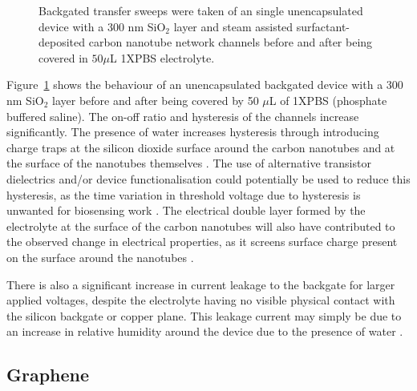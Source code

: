 \documentclass[
  a4paper,
]{scrbook}
\begin{document}
\begin{figure}
\begin{minipage}[t]{0.47\linewidth}
{{}

}

\subcaption{\label{fig-50uL-buffer}}
\end{minipage}%

\caption{\label{fig-buffer-effect-on-backgate}Backgated transfer sweeps
were taken of an single unencapsulated device with a 300 nm SiO\(_2\)
layer and steam assisted surfactant-deposited carbon nanotube network
channels before and after being covered in \(50 \mu\)L 1XPBS
electrolyte.}

\end{figure}

Figure~\ref{fig-buffer-effect-on-backgate} shows the behaviour of an
unencapsulated backgated device with a 300 nm SiO\(_2\) layer before and
after being covered by 50 \(\mu\)L of 1XPBS (phosphate buffered saline).
The on-off ratio and hysteresis of the channels increase significantly.
The presence of water increases hysteresis through introducing charge
traps at the silicon dioxide surface around the carbon nanotubes and at
the surface of the nanotubes themselves
\autocite{Kim2003,Lee2007,Ha2014}. The use of alternative transistor
dielectrics and/or device functionalisation could potentially be used to
reduce this hysteresis, as the time variation in threshold voltage due
to hysteresis is unwanted for biosensing work \autocite{Lee2007,Ha2014}.
The electrical double layer formed by the electrolyte at the surface of
the carbon nanotubes will also have contributed to the observed change
in electrical properties, as it screens surface charge present on the
surface around the nanotubes \autocite{Heller2010}.

There is also a significant increase in current leakage to the backgate
for larger applied voltages, despite the electrolyte having no visible
physical contact with the silicon backgate or copper plane. This leakage
current may simply be due to an increase in relative humidity around the
device due to the presence of water \autocite{Conseil2014}.

\hypertarget{graphene}{%
\subsection{Graphene}\label{graphene}}
\end{document}
